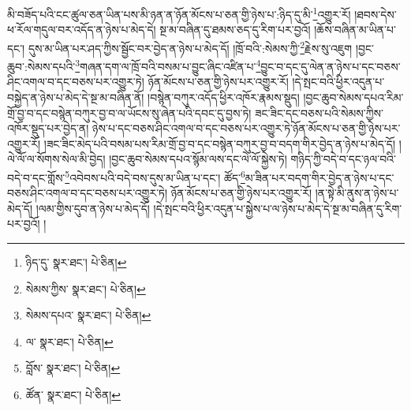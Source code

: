 མི་བཟོད་པའི་ངང་ཚུལ་ཅན་ཡིན་པས་མི་ཉན་ན་ཉོན་མོངས་པ་ཅན་གྱི་ཉེས་པ་:ཉིད་དུ་མི་\footnote{ཉིད་དུ་  སྣར་ཐང་།  པེ་ཅིན། }འགྱུར་རོ། །ཐབས་དེས་ཕ་རོལ་གདུལ་བར་འདོད་ན་ཉེས་པ་མེད་དེ། སྔ་མ་བཞིན་དུ་ཐམས་ཅད་དུ་རིག་པར་བྱའོ། །ཆོས་བཞིན་མ་ཡིན་པ་དང་། དུས་མ་ཡིན་པར་ཤད་ཀྱིས་སྦྱོང་བར་བྱེད་ན་ཉེས་པ་མེད་དོ། །ཁྲོ་བའི་:སེམས་ཀྱི་\footnote{སེམས་ཀྱིས་  སྣར་ཐང་།  པེ་ཅིན། }རྗེས་སུ་འཇུག །བྱང་ཆུབ་:སེམས་དཔའི་\footnote{སེམས་དཔའ་  སྣར་ཐང་།  པེ་ཅིན། }གཞན་དག་ལ་ཁྲོ་བའི་བསམ་པ་བྱུང་ཞིང་འཛིན་པ་\footnote{ལ་  སྣར་ཐང་།  པེ་ཅིན། }བྱུང་བ་དང་དུ་ལེན་ན་ཉེས་པ་དང་བཅས་ཤིང་འགལ་བ་དང་བཅས་པར་འགྱུར་ཏེ། ཉོན་མོངས་པ་ཅན་གྱི་ཉེས་པར་འགྱུར་རོ། །དེ་སྤང་བའི་ཕྱིར་འདུན་པ་བསྐྱེད་ན་ཉེས་པ་མེད་དེ་སྔ་མ་བཞིན་ནོ། །བསྙེན་བཀུར་འདོད་ཕྱིར་འཁོར་རྣམས་སྡུད། །བྱང་ཆུབ་སེམས་དཔའ་རིམ་གྲོ་བྱ་བ་དང་བསྙེན་བཀུར་བྱ་བ་ལ་ཡོངས་སུ་ཞེན་པའི་དབང་དུ་བྱས་ཏེ། ཟང་ཟིང་དང་བཅས་པའི་སེམས་ཀྱིས་འཁོར་སྡུད་པར་བྱེད་ན། ཉེས་པ་དང་བཅས་ཤིང་འགལ་བ་དང་བཅས་པར་འགྱུར་ཏེ་ཉོན་མོངས་པ་ཅན་གྱི་ཉེས་པར་འགྱུར་རོ། །ཟང་ཟིང་མེད་པའི་བསམ་པས་རིམ་གྲོ་བྱ་བ་དང་བསྙེན་བཀུར་བྱ་བ་བདག་གིར་བྱེད་ན་ཉེས་པ་མེད་དོ། །ལེ་ལོ་ལ་སོགས་སེལ་མི་བྱེད། །བྱང་ཆུབ་སེམས་དཔའ་སྙོམ་ལས་དང་ལེ་ལོ་སྐྱེས་ཏེ། གཉིད་ཀྱི་བདེ་བ་དང་ཉལ་བའི་བདེ་བ་དང་གློས་\footnote{བློས་  སྣར་ཐང་།  པེ་ཅིན། }འབེབས་པའི་བདེ་བས་དུས་མ་ཡིན་པ་དང་། ཚོད་\footnote{ཚོན་  སྣར་ཐང་།  པེ་ཅིན། }མ་ཟིན་པར་བདག་གིར་བྱེད་ན་ཉེས་པ་དང་བཅས་ཤིང་འགལ་བ་དང་བཅས་པར་འགྱུར་ཏེ། ཉོན་མོངས་པ་ཅན་གྱི་ཉེས་པར་འགྱུར་རོ། །ན་སྟེ་མི་ནུས་ན་ཉེས་པ་མེད་དོ། །ལམ་གྱིས་དུབ་ན་ཉེས་པ་མེད་དོ། །དེ་སྤང་བའི་ཕྱིར་འདུན་པ་སྐྱེས་པ་ལ་ཉེས་པ་མེད་དེ་སྔ་མ་བཞིན་དུ་རིག་པར་བྱའོ། །
